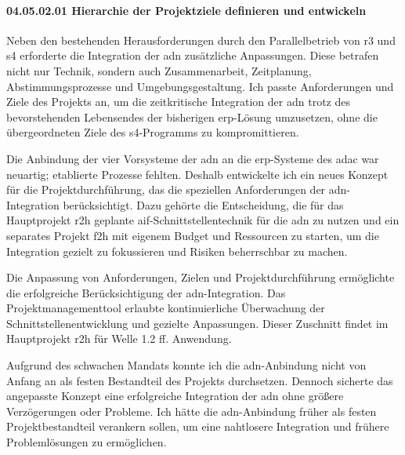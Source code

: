 \paragraph*{04.05.02.01 Hierarchie der Projektziele definieren und entwickeln}
\label{para:04.05.02.01_HierarchieDerProjektzieleDefinierenUndEntwickeln}

\par Neben den bestehenden Herausforderungen durch den Parallelbetrieb von \gls{r3} und \gls{s4} erforderte die Integration der \gls{adn} zusätzliche Anpassungen. Diese betrafen nicht nur Technik, sondern auch Zusammenarbeit, Zeitplanung, Abstimmungsprozesse und Umgebungsgestaltung. Ich passte Anforderungen und Ziele des Projekts an, um die zeitkritische Integration der \gls{adn} trotz des bevorstehenden Lebensendes der bisherigen \gls{erp}-Lösung umzusetzen, ohne die übergeordneten Ziele des \gls{s4}-Programms zu kompromittieren.

\par Die Anbindung der vier Vorsysteme der \gls{adn} an die \gls{erp}-Systeme des \gls{adac} war neuartig; etablierte Prozesse fehlten. Deshalb entwickelte ich ein neues Konzept für die Projektdurchführung, das die speziellen Anforderungen der \gls{adn}-Integration berücksichtigt. Dazu gehörte die Entscheidung, die für das Hauptprojekt \gls{r2h} geplante \gls{aif}-Schnittstellentechnik für die \gls{adn} zu nutzen und ein separates Projekt \gls{f2h} mit eigenem Budget und Ressourcen zu starten, um die Integration gezielt zu fokussieren und Risiken beherrschbar zu machen.

\par Die Anpassung von Anforderungen, Zielen und Projektdurchführung ermöglichte die erfolgreiche Berücksichtigung der \gls{adn}-Integration. Das Projektmanagementtool erlaubte kontinuierliche Überwachung der Schnittstellenentwicklung und gezielte Anpassungen. Dieser Zuschnitt findet im Hauptprojekt \gls{r2h} für Welle 1.2 ff. Anwendung.

\par Aufgrund des schwachen Mandats konnte ich die \gls{adn}-Anbindung nicht von Anfang an als festen Bestandteil des Projekts durchsetzen. Dennoch sicherte das angepasste Konzept eine erfolgreiche Integration der \gls{adn} ohne größere Verzögerungen oder Probleme. Ich hätte die \gls{adn}-Anbindung früher als festen Projektbestandteil verankern sollen, um eine nahtlosere Integration und frühere Problemlösungen zu ermöglichen.